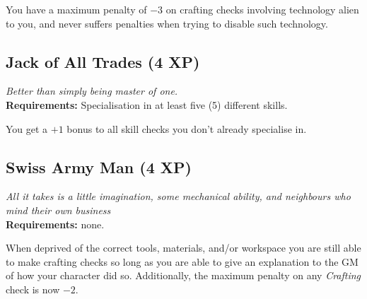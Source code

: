You have a maximum penalty of $-3$ on crafting checks involving technology alien to you, and never suffers penalties when trying to disable such technology.

\subsection*{Jack of All Trades (4 XP)}
\textit{Better than simply being master of one.}\\
\textbf{Requirements:} Specialisation in at least five (5) different skills.

You get a $+1$ bonus to all skill checks you don't already specialise in.

\subsection*{Swiss Army Man (4 XP)}
\textit{All it takes is a little imagination, some mechanical ability, and neighbours who mind their own business}\\
\textbf{Requirements:} none.

When deprived of the correct tools, materials, and/or workspace you are still able to make crafting checks so long as you are able to give an explanation to the GM of how your character did so.
Additionally, the maximum penalty on any \textit{Crafting} check is now $-2$.
